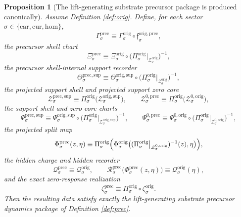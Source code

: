 \documentclass[11pt]{article}
\newcommand{\Car}{\mathrm{car}}
\newcommand{\Cur}{\mathrm{cur}}
\newcommand{\Hom}{\mathrm{hom}}
\newcommand{\PrecSection}[1]{\Gamma_{#1}^{\mathrm{prec}}}
\newcommand{\PrecChart}[1]{\Xi_{#1}^{\mathrm{prec}}}
\newcommand{\PrecSupport}[1]{\Theta_{#1}^{\mathrm{prec,sup}}}
\newcommand{\PrecSupportShell}[1]{\mathcal Z_{#1}^{\mathrm{prec,sup}}}
\newcommand{\PrecZeroCore}[1]{\mathcal Z_{#1}^{0,\mathrm{prec}}}
\newcommand{\PrecEqChart}[1]{\Psi_{#1}^{\mathrm{prec,sup}}}
\newcommand{\PrecZeroChart}[1]{\Psi_{#1}^{0,\mathrm{prec}}}
\newcommand{\PrecSplit}[1]{\Phi_{#1}^{\mathrm{prec}}}
\newcommand{\PrecCharge}[1]{\mathcal Q_{#1}^{\mathrm{prec}}}
\newcommand{\PrecResidual}[1]{\mathcal R_{#1}^{\mathrm{prec}}}
\newcommand{\PrecEmbed}[1]{\zeta_{#1}^{\mathrm{prec}}}
\newcommand{\OrigProj}[1]{\Pi_{#1}^{\mathrm{orig}}}
\newcommand{\OrigPrecMin}[1]{\mathfrak f_{#1}^{\mathrm{orig,prec}}}
\newcommand{\OrigSection}[1]{\Gamma_{#1}^{\mathrm{orig}}}
\newcommand{\OrigShellSet}[1]{\mathcal Z_{#1}^{\mathrm{orig}}}
\newcommand{\OrigChart}[1]{\Xi_{#1}^{\mathrm{orig}}}
\newcommand{\OrigSupport}[1]{\Theta_{#1}^{\mathrm{orig,sup}}}
\newcommand{\OrigSupportShell}[1]{\mathcal Z_{#1}^{\mathrm{orig,sup}}}
\newcommand{\OrigZeroCore}[1]{\mathcal Z_{#1}^{0,\mathrm{orig}}}
\newcommand{\OrigEqChart}[1]{\Psi_{#1}^{\mathrm{orig,sup}}}
\newcommand{\OrigZeroChart}[1]{\Psi_{#1}^{0,\mathrm{orig}}}
\newcommand{\OrigSplit}[1]{\Phi_{#1}^{\mathrm{orig}}}
\newcommand{\OrigCharge}[1]{\mathcal Q_{#1}^{\mathrm{orig}}}
\newcommand{\OrigEmbed}[1]{\zeta_{#1}^{\mathrm{orig}}}
\newtheorem{proposition}{Proposition}
\begin{document}
\begin{proposition}[The lift-generating substrate precursor package is produced canonically]
\label{prop:prec}
Assume Definition \ref{def:orig}. Define, for each sector \(\sigma\in\{\Car,\Cur,\Hom\}\),
\begin{equation}
\PrecSection{\sigma}
\equiv
\OrigSection{\sigma}\circ\OrigPrecMin{\sigma},
\label{eq:propinducedprecsection}
\end{equation}
the precursor shell chart
\begin{equation}
\PrecChart{\sigma}
\equiv
\OrigChart{\sigma}\circ
\bigl(\OrigProj{\sigma}\big|_{\OrigShellSet{\sigma}}\bigr)^{-1},
\label{eq:propinducedprecchart}
\end{equation}
the precursor shell-internal support recorder
\begin{equation}
\PrecSupport{\sigma}
\equiv
\OrigSupport{\sigma}\circ
\bigl(\OrigProj{\sigma}\big|_{\OrigShellSet{\sigma}}\bigr)^{-1},
\label{eq:propinducedprecsupport}
\end{equation}
the projected support shell and projected support zero core
\begin{equation}
\PrecSupportShell{\sigma}
\equiv
\OrigProj{\sigma}\bigl(\OrigSupportShell{\sigma}\bigr),
\qquad
\PrecZeroCore{\sigma}
\equiv
\OrigProj{\sigma}\bigl(\OrigZeroCore{\sigma}\bigr),
\label{eq:propinducedprecshells}
\end{equation}
the support-shell and zero-core charts
\begin{equation}
\PrecEqChart{\sigma}
\equiv
\OrigEqChart{\sigma}\circ
\bigl(\OrigProj{\sigma}\big|_{\OrigSupportShell{\sigma}}\bigr)^{-1},
\qquad
\PrecZeroChart{\sigma}
\equiv
\OrigZeroChart{\sigma}\circ
\bigl(\OrigProj{\sigma}\big|_{\OrigZeroCore{\sigma}}\bigr)^{-1},
\label{eq:propinducedpreccharts}
\end{equation}
the projected split map
\begin{equation}
\PrecSplit{\sigma}(z,\eta)
\equiv
\OrigProj{\sigma}\Bigl(
\OrigSplit{\sigma}\bigl(
(\OrigProj{\sigma}\big|_{\OrigZeroCore{\sigma}})^{-1}(z),
\eta
\bigr)
\Bigr),
\label{eq:propinducedprecsplit}
\end{equation}
the hidden charge and hidden recorder
\begin{equation}
\PrecCharge{\sigma}
\equiv
\OrigCharge{\sigma},
\qquad
\PrecResidual{\sigma}\bigl(\PrecSplit{\sigma}(z,\eta)\bigr)
\equiv
\OrigCharge{\sigma}(\eta),
\label{eq:propinducedprecresidual}
\end{equation}
and the exact zero-response realization
\begin{equation}
\PrecEmbed{\sigma}
\equiv
\OrigProj{\sigma}\circ\OrigEmbed{\sigma}.
\label{eq:propinducedprecembed}
\end{equation}
Then the resulting data satisfy exactly the lift-generating substrate precursor dynamics package of Definition \ref{def:prec}.
\end{proposition}
\end{document}
